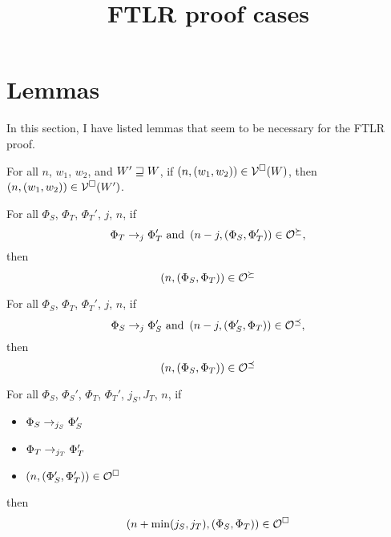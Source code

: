 \documentclass[a4paper]{article}
\title{FTLR proof cases}
\begin{document}
\maketitle
\section{Lemmas}
In this section, I have listed lemmas that seem to be necessary for the FTLR proof.
\begin{lemma}
  For all $n$, $w_1$, $w_2$, and $W' \future W$, if $\npair{(w_1,w_2)} \in \lrv(W)$, then $\npair{(w_1,w_2)} \in \lrv(W')$.
\end{lemma}

\begin{lemma}
  For all $\Phi_S$, $\Phi_T$, $\Phi_T'$, $j$, $n$, if
\[
  \Phi_T \nstep[j] \Phi_T' \text{ and } \npair[n-j]{(\Phi_S,\Phi_T')} \in \lror,
\]
then
\[
  \npair{(\Phi_S,\Phi_T)} \in \lror
\]
\end{lemma}

\begin{lemma}
  For all $\Phi_S$, $\Phi_T$, $\Phi_T'$, $j$, $n$, if
\[
  \Phi_S \nstep[j] \Phi_S' \text{ and } \npair[n-j]{(\Phi_S',\Phi_T)} \in \lrol,
\]
then
\[
  \npair{(\Phi_S,\Phi_T)} \in \lrol
\]
\end{lemma}


\begin{lemma}
  For all $\Phi_S$, $\Phi_S'$, $\Phi_T$, $\Phi_T'$, $j_S,J_T$, $n$, if
  \begin{itemize}
  \item $\Phi_S \nstep[j_S] \Phi_S'$
  \item $\Phi_T \nstep[j_T] \Phi_T'$
  \item $\npair{(\Phi_S',\Phi_T')} \in \lro$
\end{itemize}
then
\[
  \npair[n+\min(j_S,j_T)]{(\Phi_S,\Phi_T)} \in \lro
\]
\end{lemma}
\end{document}
